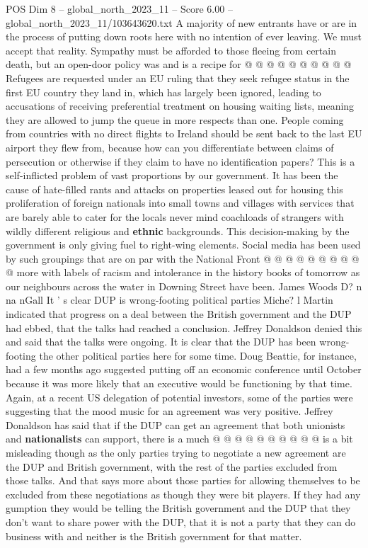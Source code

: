 \begin{textsample}{POS Dim 8 – global\_north\_2023\_11 – Score 6.00 – global\_north\_2023\_11/103643620.txt}
A majority of new entrants have or are in the process of putting down roots here with no intention of ever leaving.
We must accept that reality.
Sympathy must be afforded to those fleeing from certain death, but an open-door policy was and is a recipe for @ @ @ @ @ @ @ @ @ @ Refugees are requested under an EU ruling that they seek refugee status in the first EU country they land in, which has largely been ignored, leading to accusations of receiving preferential treatment on housing waiting lists, meaning they are allowed to jump the queue in more respects than one.
People coming from countries with no direct flights to Ireland should be sent back to the last EU airport they flew from, because how can you differentiate between claims of persecution or otherwise if they claim to have no identification papers?
This is a self-inflicted problem of vast proportions by our government.
It has been the cause of hate-filled rants and attacks on properties leased out for housing this proliferation of foreign nationals into small towns and villages with services that are barely able to cater for the locals never mind coachloads of strangers with wildly different religious and \textbf{ethnic} backgrounds.
This decision-making by the government is only giving fuel to right-wing elements.
Social media has been used by such groupings that are on par with the National Front @ @ @ @ @ @ @ @ @ @ more with labels of racism and intolerance in the history books of tomorrow as our neighbours across the water in Downing Street have been.
James Woods D? n na nGall It ' s clear DUP is wrong-footing political parties Miche? l Martin indicated that progress on a deal between the British government and the DUP had ebbed, that the talks had reached a conclusion.
Jeffrey Donaldson denied this and said that the talks were ongoing.
It is clear that the DUP has been wrong-footing the other political parties here for some time.
Doug Beattie, for instance, had a few months ago suggested putting off an economic conference until October because it was more likely that an executive would be functioning by that time.
Again, at a recent US delegation of potential investors, some of the parties were suggesting that the mood music for an agreement was very positive.
Jeffrey Donaldson has said that if the DUP can get an agreement that both unionists and \textbf{nationalists} can support, there is a much @ @ @ @ @ @ @ @ @ @ is a bit misleading though as the only parties trying to negotiate a new agreement are the DUP and British government, with the rest of the parties excluded from those talks.
And that says more about those parties for allowing themselves to be excluded from these negotiations as though they were bit players.
If they had any gumption they would be telling the British government and the DUP that they don't want to share power with the DUP, that it is not a party that they can do business with and neither is the British government for that matter.

\end{textsample}
